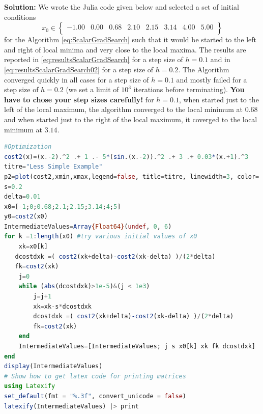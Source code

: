 \textbf{Solution:} We wrote the Julia code given below and selected a set of initial conditions 
\begin{equation}
x_0 \in 
\left\{
\begin{array}{cccccccc}
-1.00 & 0.00 & 0.68 & 2.10 & 2.15 & 3.14 & 4.00 & 5.00 \\
\end{array}
\right\}
\end{equation}
for the Algorithm \eqref{eq:ScalarGradSearch} such that it would be started to the left and right of local minima and very close to the local maxima. The results are reported in \eqref{eq:resultsScalarGradSearch} for a step size of $h=0.1$ and in \eqref{eq:resultsScalarGradSearch02} for a step size of $h=0.2.$ The Algorithm converged quickly in all cases for a step size of $h=0.1$ and mostly failed for a step size of $h=0.2$ (we set a limit of $10^3$ iterations before terminating). \textbf{You have to chose your step sizes carefully!} for $h=0.1$, when started just to the left of the local maximum, the algorithm converged to the local minimum at $0.68$ and when started just to the right of the local maximum, it coverged to the local minimum at $3.14$.\\

\begin{lstlisting}[language=Julia,style=mystyle]
#Optimization
cost2(x)=(x.-2).^2 .+ 1 .- 5*(sin.(x.-2)).^2 .+ 3 .+ 0.03*(x.+1).^3
titre="Less Simple Example"
p2=plot(cost2,xmin,xmax,legend=false, title=titre, linewidth=3, color=:red )
s=0.2
delta=0.01
x0=[-1;0;0.68;2.1;2.15;3.14;4;5]
y0=cost2(x0)
IntermediateValues=Array{Float64}(undef, 0, 6)
for k =1:length(x0) #try various initial values of x0
    xk=x0[k]
   dcostdxk =( cost2(xk+delta)-cost2(xk-delta) )/(2*delta)
   fk=cost2(xk)
    j=0
    while (abs(dcostdxk)>1e-5)&(j < 1e3)
        j=j+1
        xk=xk-s*dcostdxk
        dcostdxk =( cost2(xk+delta)-cost2(xk-delta) )/(2*delta)
        fk=cost2(xk)
    end
    IntermediateValues=[IntermediateValues; j s x0[k] xk fk dcostdxk]
end
display(IntermediateValues)
# Show how to get latex code for printing matrices
using Latexify
set_default(fmt = "%.3f", convert_unicode = false)
latexify(IntermediateValues) |> print 
\end{lstlisting}


